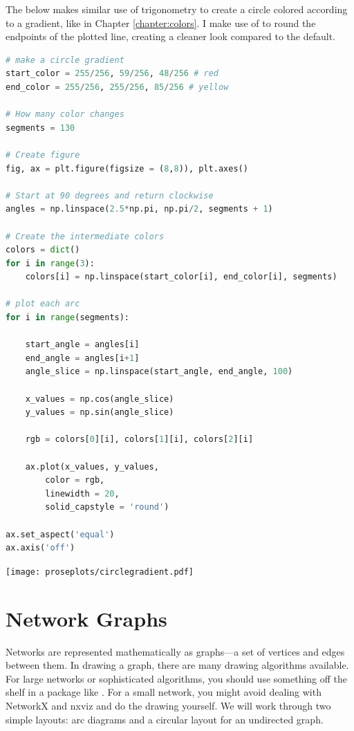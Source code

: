 The below makes similar use of trigonometry to create a circle colored according to a gradient, like in Chapter \ref{chapter:colors}. I make use of  to round the endpoints of the plotted line, creating a cleaner look compared to the default. 

\begin{lstlisting}[language = Python]
# make a circle gradient
start_color = 255/256, 59/256, 48/256 # red
end_color = 255/256, 255/256, 85/256 # yellow

# How many color changes
segments = 130

# Create figure
fig, ax = plt.figure(figsize = (8,8)), plt.axes()

# Start at 90 degrees and return clockwise
angles = np.linspace(2.5*np.pi, np.pi/2, segments + 1)

# Create the intermediate colors
colors = dict()
for i in range(3):
    colors[i] = np.linspace(start_color[i], end_color[i], segments)
    
# plot each arc
for i in range(segments):
    
    start_angle = angles[i]
    end_angle = angles[i+1]
    angle_slice = np.linspace(start_angle, end_angle, 100)
    
    x_values = np.cos(angle_slice)
    y_values = np.sin(angle_slice)
    
    rgb = colors[0][i], colors[1][i], colors[2][i]
    
    ax.plot(x_values, y_values, 
        color = rgb,
        linewidth = 20, 
        solid_capstyle = 'round')

ax.set_aspect('equal')
ax.axis('off')
\end{lstlisting}

\begin{center}
    \texttt{[image: proseplots/circlegradient.pdf]}
\end{center}

\section{Network Graphs}

Networks are represented mathematically as graphs---a set of vertices and edges between them. In drawing a graph, there are many drawing algorithms available. For large networks or sophisticated algorithms, you should use something off the shelf in a package like . For a small network, you might avoid dealing with NetworkX and nxviz and do the drawing yourself. We will work through two simple layouts: arc diagrams and a circular layout for an undirected graph. 

